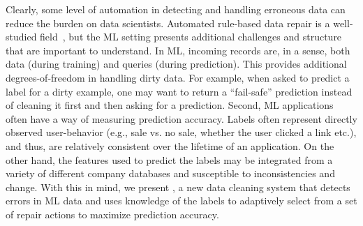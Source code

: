 Clearly, some level of automation in detecting and handling erroneous data can reduce the burden on data scientists.
Automated rule-based data repair is a well-studied field~\cite{DBLP:conf/sigmod/ChuIKW16}, but the ML setting presents additional challenges and structure that are important to understand.
In ML, incoming records are, in a sense, both data (during training) and queries (during prediction).
This provides additional degrees-of-freedom in handling dirty data.
For example, when asked to predict a label for a dirty example, one may want to return a ``fail-safe'' prediction instead of cleaning it first and then asking for a prediction.
Second, ML applications often have a way of measuring prediction accuracy.
Labels often represent directly observed user-behavior (e.g., sale vs. no sale, whether the user clicked a link etc.), and thus, are relatively consistent over the lifetime of an application.
On the other hand, the features used to predict the labels may be integrated from a variety of different company databases and susceptible to inconsistencies and change.
With this in mind, we present \sys, a new data cleaning system that detects errors in ML data and uses knowledge of the labels to adaptively select from a set of repair actions to maximize prediction accuracy.
\fi